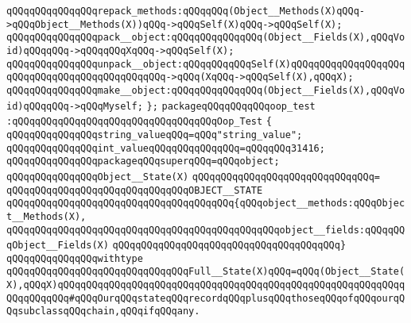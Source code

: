 \newline
\verb|qQQqqQQqqQQqqQQqrepack_methods:qQQqqQQq(Object__Methods(X)qQQq->qQQqObject__Methods(X))qQQq->qQQqSelf(X)qQQq->qQQqSelf(X);|\newline
\newline
\newline
\verb|qQQqqQQqqQQqqQQqpack__object:qQQqqQQqqQQqqQQq(Object__Fields(X),qQQqVoid)qQQqqQQq->qQQqqQQqXqQQq->qQQqSelf(X);|\newline
\verb|qQQqqQQqqQQqqQQqunpack__object:qQQqqQQqqQQqSelf(X)qQQqqQQqqQQqqQQqqQQqqQQqqQQqqQQqqQQqqQQqqQQqqQQq->qQQq(XqQQq->qQQqSelf(X),qQQqX);|\newline
\verb|qQQqqQQqqQQqqQQqmake__object:qQQqqQQqqQQqqQQq(Object__Fields(X),qQQqVoid)qQQqqQQq->qQQqMyself;|\newline
\newline
\verb|};|\newline
\newline
\verb|packageqQQqqQQqqQQqoop_test|\newline
\verb|:qQQqqQQqqQQqqQQqqQQqqQQqqQQqqQQqqQQqOop_Test|\newline
\verb|{|\newline
\verb|qQQqqQQqqQQqqQQqstring_valueqQQq=qQQq"string_value";|\newline
\verb|qQQqqQQqqQQqqQQqint_valueqQQqqQQqqQQqqQQq=qQQqqQQq31416;|\newline
\newline
\verb|qQQqqQQqqQQqqQQqpackageqQQqsuperqQQq=qQQqobject;|\newline
\newline
\verb|qQQqqQQqqQQqqQQqObject__State(X)|\newline
\verb|qQQqqQQqqQQqqQQqqQQqqQQqqQQqqQQq=|\newline
\verb|qQQqqQQqqQQqqQQqqQQqqQQqqQQqqQQqOBJECT__STATE|\newline
\verb|qQQqqQQqqQQqqQQqqQQqqQQqqQQqqQQqqQQqqQQq{qQQqobject__methods:qQQqObject__Methods(X),|\newline
\verb|qQQqqQQqqQQqqQQqqQQqqQQqqQQqqQQqqQQqqQQqqQQqqQQqobject__fields:qQQqqQQqObject__Fields(X)|\newline
\verb|qQQqqQQqqQQqqQQqqQQqqQQqqQQqqQQqqQQqqQQq}|\newline
\verb|qQQqqQQqqQQqqQQqwithtype|\newline
\verb|qQQqqQQqqQQqqQQqqQQqqQQqqQQqqQQqFull__State(X)qQQq=qQQq(Object__State(X),qQQqX)qQQqqQQqqQQqqQQqqQQqqQQqqQQqqQQqqQQqqQQqqQQqqQQqqQQqqQQqqQQqqQQqqQQqqQQq#qQQqOurqQQqstateqQQqrecordqQQqplusqQQqthoseqQQqofqQQqourqQQqsubclassqQQqchain,qQQqifqQQqany.|\newline
